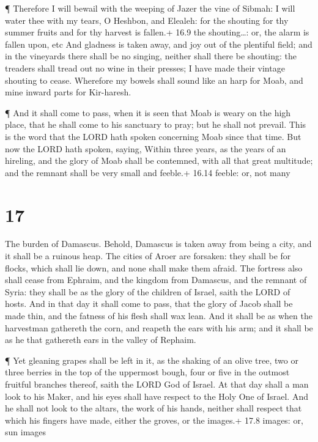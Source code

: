  ¶ Therefore I will bewail with the weeping of Jazer the
vine of Sibmah: I will water thee with my tears, O Heshbon, and Elealeh:
for the shouting for thy summer fruits and for thy harvest is fallen.+
16.9 the shouting\ldots: or, the alarm is fallen upon, etc 
And gladness is taken away, and joy out of the plentiful field; and in
the vineyards there shall be no singing, neither shall there be
shouting: the treaders shall tread out no wine in their presses; I have
made their vintage shouting to cease.  Wherefore my bowels
shall sound like an harp for Moab, and mine inward parts for Kir-haresh.

 ¶ And it shall come to pass, when it is seen that Moab is
weary on the high place, that he shall come to his sanctuary to pray;
but he shall not prevail.  This is the word that the LORD
hath spoken concerning Moab since that time.  But now the
LORD hath spoken, saying, Within three years, as the years of an
hireling, and the glory of Moab shall be contemned, with all that great
multitude; and the remnant shall be very small and feeble.+ 16.14
feeble: or, not many

\hypertarget{section-16}{%
\section{17}\label{section-16}}

 The burden of Damascus. Behold, Damascus is taken away from
being a city, and it shall be a ruinous heap.  The cities of
Aroer are forsaken: they shall be for flocks, which shall lie down, and
none shall make them afraid.  The fortress also shall cease
from Ephraim, and the kingdom from Damascus, and the remnant of Syria:
they shall be as the glory of the children of Israel, saith the LORD of
hosts.  And in that day it shall come to pass, that the
glory of Jacob shall be made thin, and the fatness of his flesh shall
wax lean.  And it shall be as when the harvestman gathereth
the corn, and reapeth the ears with his arm; and it shall be as he that
gathereth ears in the valley of Rephaim.

 ¶ Yet gleaning grapes shall be left in it, as the shaking
of an olive tree, two or three berries in the top of the uppermost
bough, four or five in the outmost fruitful branches thereof, saith the
LORD God of Israel.  At that day shall a man look to his
Maker, and his eyes shall have respect to the Holy One of Israel.
 And he shall not look to the altars, the work of his hands,
neither shall respect that which his fingers have made, either the
groves, or the images.+ 17.8 images: or, sun images

